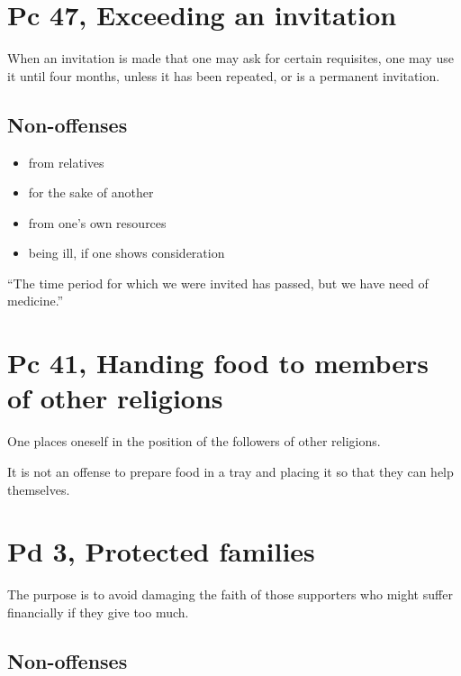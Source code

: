 \section{Pc 47, Exceeding an invitation}

When an invitation is made that one may ask for certain requisites, one
may use it until four months, unless it has been repeated, or is a
permanent invitation.

\subsection{Non-offenses}

\begin{multicols}{2}

\begin{itemize}
\tightlist
\item
  from relatives
\item
  for the sake of another
\item
  from one's own resources
\item
  being ill, if one shows consideration
\end{itemize}

\end{multicols}

``The time period for which we were invited has passed, but we have need
of medicine.''

\section{Pc 41, Handing food to members of other religions}

One places oneself in the position of the followers of other religions.

It is not an offense to prepare food in a tray and placing it so that
they can help themselves.

\section{Pd 3, Protected families}

The purpose is to avoid damaging the faith of those supporters who might
suffer financially if they give too much.

\subsection{Non-offenses}

